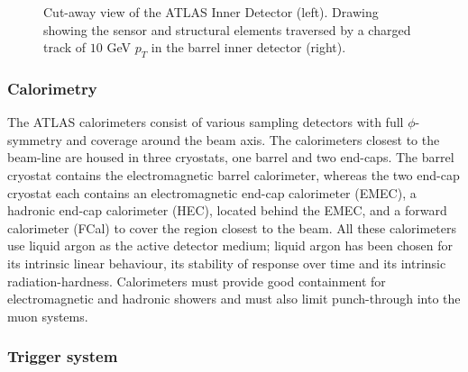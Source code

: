 \documentclass[12pt, twoside]{article}
\numberwithin{equation}{section}
\numberwithin{figure}{section}
\begin{document}
\begin{figure}[h]
    \fi
    \noindent
    \parbox{0.45\textwidth}{%
        \centering
    }
    \hfil
    \parbox{0.45\textwidth}{%
        \centering
    }
    \captionsetup{width=0.9\textwidth}
    \caption{Cut-away view of the ATLAS Inner Detector (left). Drawing showing the sensor and structural elements traversed by a charged track of $10$ GeV $p_{T}$ in the barrel inner detector (right).}
    \label{fig:InnerDetector}
\end{figure}

\subsubsection{Calorimetry}
\label{subsubsec:Calorimetry}

The ATLAS calorimeters consist of various sampling detectors with full $\phi$-symmetry and coverage around the beam axis. The calorimeters closest to the beam-line are housed in three cryostats, one barrel and two end-caps. The barrel cryostat contains the electromagnetic barrel calorimeter, whereas the two end-cap cryostat each contains an electromagnetic end-cap calorimeter (EMEC), a hadronic end-cap calorimeter (HEC), located behind the EMEC, and a forward calorimeter (FCal) to cover the region closest to the beam. All these calorimeters use liquid argon as the active detector medium; liquid argon has been chosen for its intrinsic linear behaviour, its stability of response over time and its intrinsic radiation-hardness. Calorimeters must provide good containment for electromagnetic and hadronic showers and must also limit punch-through into the muon systems.

\subsubsection{Trigger system}
\label{subsubsec:TriggerSystem}
\end{document}

